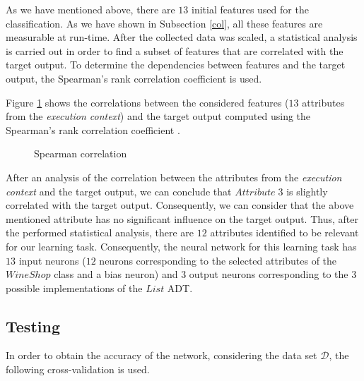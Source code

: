 As we have mentioned above, there are $13$ initial features used for the classification. As we have shown in Subsection \ref{col}, all these features are measurable at run-time. After the collected data was scaled, a statistical analysis is carried out in order to find a subset of features that are correlated with the target output. To determine the dependencies between features and the target output, the Spearman's rank correlation coefficient \cite{spearman} is used.

Figure \ref{cor} shows the correlations between the considered features ($13$ attributes from the \emph{execution context}) and the target output computed using the Spearman's rank correlation coefficient \cite{spearman}.


\begin{figure}
\centerline{}
       \caption{Spearman correlation}
 \label{cor}
\end{figure}


After an analysis of the correlation between the attributes from the \emph{execution context} and the target output, we can conclude that $Attribute\;3$ is slightly correlated with the target output. Consequently, we can consider that the above mentioned attribute has no significant influence on the target output. Thus, after the performed statistical analysis, there are $12$ attributes identified to be relevant for our learning task. Consequently, the neural network for this learning task has $13$ input neurons ($12$ neurons corresponding to the selected attributes of the $WineShop$ class and a bias neuron) and $3$ output neurons corresponding to the $3$ possible implementations of the $List$ ADT.

\subsection{Testing}


In order to obtain the accuracy of the network, considering the data set $\mathcal{D}$, the following cross-validation is used.

